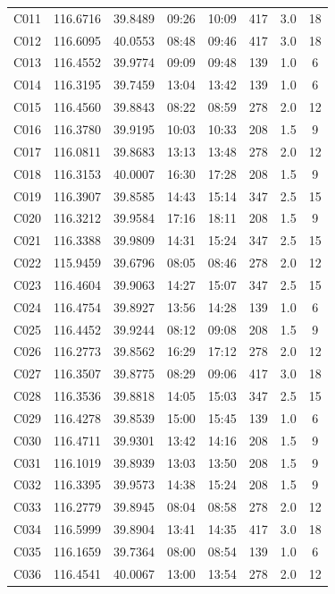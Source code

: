 \documentclass{setp-new}
\begin{document}
\begin{longtable}{@{\extracolsep{\fill}}cccccccc@{}}
C011 & 116.6716 & 39.8489 & 09:26 & 10:09 & 417 & 3.0 & 18\\
C012 & 116.6095 & 40.0553 & 08:48 & 09:46 & 417 & 3.0 & 18\\
C013 & 116.4552 & 39.9774 & 09:09 & 09:48 & 139 & 1.0 & 6\\
C014 & 116.3195 & 39.7459 & 13:04 & 13:42 & 139 & 1.0 & 6\\
C015 & 116.4560 & 39.8843 & 08:22 & 08:59 & 278 & 2.0 & 12\\
C016 & 116.3780 & 39.9195 & 10:03 & 10:33 & 208 & 1.5 & 9\\
C017 & 116.0811 & 39.8683 & 13:13 & 13:48 & 278 & 2.0 & 12\\
C018 & 116.3153 & 40.0007 & 16:30 & 17:28 & 208 & 1.5 & 9\\
C019 & 116.3907 & 39.8585 & 14:43 & 15:14 & 347 & 2.5 & 15\\
C020 & 116.3212 & 39.9584 & 17:16 & 18:11 & 208 & 1.5 & 9\\
C021 & 116.3388 & 39.9809 & 14:31 & 15:24 & 347 & 2.5 & 15\\
C022 & 115.9459 & 39.6796 & 08:05 & 08:46 & 278 & 2.0 & 12\\
C023 & 116.4604 & 39.9063 & 14:27 & 15:07 & 347 & 2.5 & 15\\
C024 & 116.4754 & 39.8927 & 13:56 & 14:28 & 139 & 1.0 & 6\\
C025 & 116.4452 & 39.9244 & 08:12 & 09:08 & 208 & 1.5 & 9\\
C026 & 116.2773 & 39.8562 & 16:29 & 17:12 & 278 & 2.0 & 12\\
C027 & 116.3507 & 39.8775 & 08:29 & 09:06 & 417 & 3.0 & 18\\
C028 & 116.3536 & 39.8818 & 14:05 & 15:03 & 347 & 2.5 & 15\\
C029 & 116.4278 & 39.8539 & 15:00 & 15:45 & 139 & 1.0 & 6\\
C030 & 116.4711 & 39.9301 & 13:42 & 14:16 & 208 & 1.5 & 9\\
C031 & 116.1019 & 39.8939 & 13:03 & 13:50 & 208 & 1.5 & 9\\
C032 & 116.3395 & 39.9573 & 14:38 & 15:24 & 208 & 1.5 & 9\\
C033 & 116.2779 & 39.8945 & 08:04 & 08:58 & 278 & 2.0 & 12\\
C034 & 116.5999 & 39.8904 & 13:41 & 14:35 & 417 & 3.0 & 18\\
C035 & 116.1659 & 39.7364 & 08:00 & 08:54 & 139 & 1.0 & 6\\
C036 & 116.4541 & 40.0067 & 13:00 & 13:54 & 278 & 2.0 & 12\\

\end{longtable}
\end{document}
